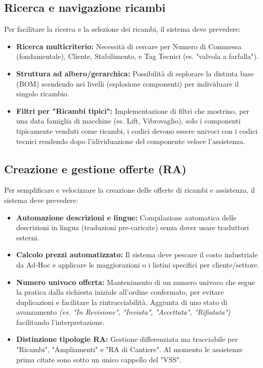 \documentclass[12pt, a4paper]{article} %
\begin{document}
\subsection{Ricerca e navigazione ricambi}
Per facilitare la ricerca e la selezione dei ricambi, il sistema deve prevedere:
\begin{itemize}
      \item \textbf{Ricerca multicriterio:} Necessità di cercare per Numero di Commessa (fondamentale), Cliente, Stabilimento, e Tag Tecnici (es. "valvola a farfalla").
      \item \textbf{Struttura ad albero/gerarchica:} Possibilità di esplorare la distinta base (BOM) scendendo nei livelli (esplosione componenti) per individuare il singolo ricambio.
      \item \textbf{Filtri per "Ricambi tipici":} Implementazione di filtri che mostrino, per una data famiglia di macchine (es. Lift, Vibrovaglio), solo i componenti tipicamente venduti come ricambi,
            i codici devono essere univoci con i codici tecnici rendendo dopo l'idividuazione del componente veloce l'assistenza.
\end{itemize}

\subsection{Creazione e gestione offerte (RA)}
Per semplificare e velocizzare la creazione delle offerte di ricambi e assistenza, il sistema deve prevedere:
\begin{itemize}
      \item \textbf{Automazione descrizioni e lingue:} Compilazione automatica delle descrizioni in lingua (traduzioni pre-caricate) senza dover usare traduttori esterni.
      \item \textbf{Calcolo prezzi automatizzato:} Il sistema deve pescare il costo industriale da Ad-Hoc e applicare le maggiorazioni o i listini specifici per cliente/settore.
      \item \textbf{Numero univoco offerta:} Mantenimento di un numero univoco che segue la pratica dalla richiesta iniziale all'ordine confermato, per evitare duplicazioni e facilitare la rintracciabilità.
            Aggiunta di uno stato di avanzamento \textit{(es. "In Revisione", "Inviata", "Accettata", "Rifiutata")} facilitando l'interpretazione.
      \item \textbf{Distinzione tipologie RA:} Gestione differenziata ma tracciabile per "Ricambi", "Ampliamenti" e "RA di Cantiere". Al momento le assistenze prima citate sono sotto un unico cappello del "VSS".
\end{itemize}
\end{document}
